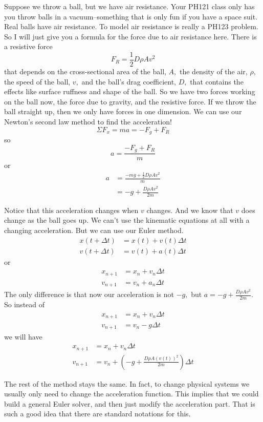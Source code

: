 \documentclass{book}
\begin{document}
Suppose we throw a ball, but we have air resistance. Your PH121 class only has
you throw balls in a vacuum--something that is only fun if you have a space
suit. Real balls have air resistance. To model air resistance is really a
PH123 problem. So I will just give you a formula for the force due to air
resistance here. There is a resistive force
\[
F_{R}=\frac{1}{2}D\rho Av^{2}
\]
that depends on the cross-sectional area of the ball, $A,$ the density of the
air, $\rho,$ the speed of the ball, $v,$ and the ball's drag coefficient, $D,$
that contains the effects like surface ruffness and shape of the ball. So we
have two forces working on the ball now, the force due to gravity, and the
resistive force. If we throw the ball straight up, then we only have forces in
one dimension. We can use our Newton's second law method to find the acceleration! 
\[
\Sigma F_{x}=ma=-F_{g}+F_{R}
\]
so \[
a=\frac{-F_{g}+F_{R}}{m}
\]
or \begin{align*}
a  & =\frac{-mg+\frac{1}{2}D\rho Av^{2}}{m}\\
& =-g+\frac{D\rho Av^{2}}{2m} \end{align*}


Notice that this acceleration changes when $v$ changes. And we know that $v$
does change as the ball goes up. We can't use the kinematic equations at all
with a changing acceleration. But we can use our Euler method. \begin{align*}
x(t+\Delta t)  & =x(t)+v(t)\Delta t\\
v(t+\Delta t)  & =v(t)+a\left(  t\right)  \Delta t
\end{align*}
or \begin{align*}
x_{n+1}  & =x_{n}+v_{n}\Delta t\\
v_{n+1}  & =v_{n}+a_{n}\Delta t
\end{align*}
The only difference is that now our acceleration is not $-g,$ but
$a=-g+\frac{D\rho Av^{2}}{2m}.$ So instead of
\begin{align*}
x_{n+1}  & =x_{n}+v_{n}\Delta t\\
v_{n+1}  & =v_{n}-g\Delta t
\end{align*}
we will have \begin{align*}
x_{n+1}  & =x_{n}+v_{n}\Delta t\\
v_{n+1}  & =v_{n}+\left(  -g+\frac{D\rho A\left(  v(t)\right)  ^{2}} {2m}\right)  \Delta t
\end{align*}


The rest of the method stays the same. In fact, to change physical systems we
usually only need to change the acceleration function. This implies that we
could build a general Euler solver, and then just modify the acceleration
part. That is such a good idea that there are standard notations for this.
\end{document}
